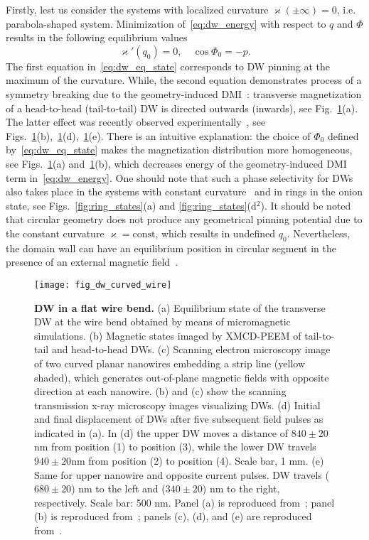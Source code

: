 Firstly, lest us consider the systems with localized curvature $\varkappa(\pm\infty)=0$, i.e. parabola-shaped system. Minimization of~\eqref{eq:dw_energy} with respect to $q$ and $\Phi$ results in the following equilibrium values
\begin{equation}\label{eq:dw_eq_state}
\varkappa'\left(q_0\right)=0,\quad\cos\Phi_0=-p.
\end{equation}
The first equation in~\eqref{eq:dw_eq_state} corresponds to DW pinning at the maximum of the curvature. While, the second equation demonstrates process of a symmetry breaking due to the geometry-induced DMI~\cite{Yershov15b}: transverse magnetization of a head-to-head (tail-to-tail) DW is directed outwards (inwards), see Fig.~\ref{fig:dw_wire_1}(a). The latter effect was recently observed experimentally~\cite{Kim14,Volkov19c}, see Figs.~\ref{fig:dw_wire_1}(b),~\ref{fig:dw_wire_1}(d),~\ref{fig:dw_wire_1}(e). There is an intuitive explanation: the choice of $\Phi_0$ defined by~\eqref{eq:dw_eq_state} makes the magnetization distribution more homogeneous, see Figs.~\ref{fig:dw_wire_1}(a) and~\ref{fig:dw_wire_1}(b), which decreases energy of the geometry-induced DMI term in~\eqref{eq:dw_energy}. One should note that such a phase selectivity for DWs also takes place in the systems with constant curvature~\cite{Moreno17a} and in rings in the onion state, see Figs.~\ref{fig:ring_states}(a) and \ref{fig:ring_states}(d$^2$). It should be noted that circular geometry does not produce any geometrical pinning potential due to the constant curvature $\varkappa=\text{const}$, which results in undefined $q_0$. Nevertheless, the domain wall can have an equilibrium position in circular segment in the presence of an external magnetic field~\cite{Kruger07a,Jamali11}.

\begin{figure}[t]
	\texttt{[image: fig\_dw\_curved\_wire]}
	\caption{\label{fig:dw_wire_1}%
		\textbf{DW in a flat wire bend.} (a) Equilibrium state of the transverse DW at the wire bend obtained by means of micromagnetic simulations. (b) Magnetic states imaged by XMCD-PEEM of tail-to-tail and head-to-head DWs. (c) Scanning electron microscopy image of two curved planar nanowires embedding a strip line (yellow shaded), which generates out-of-plane magnetic	fields with opposite direction at each nanowire. (b) and (c) show the scanning transmission x-ray microscopy images visualizing DWs. (d) Initial and final displacement of DWs after five subsequent field pulses as indicated in (a). In (d) the upper DW moves a distance of $840\pm20$nm from position (1) to position (3), while the lower DW travels $940\pm20$nm from position (2) to position (4). Scale bar, 1 mm. (e) Same for upper nanowire and opposite current pulses. DW travels ($680 \pm 20$) nm to the left and ($340\pm20$) nm to the right, respectively. Scale bar: 500 nm. Panel (a) is reproduced from~\cite{Yershov15b}; panel (b) is reproduced from~\cite{Volkov19c}; panels (c), (d), and (e) are reproduced from~\cite{Kim14}.}
\end{figure}

